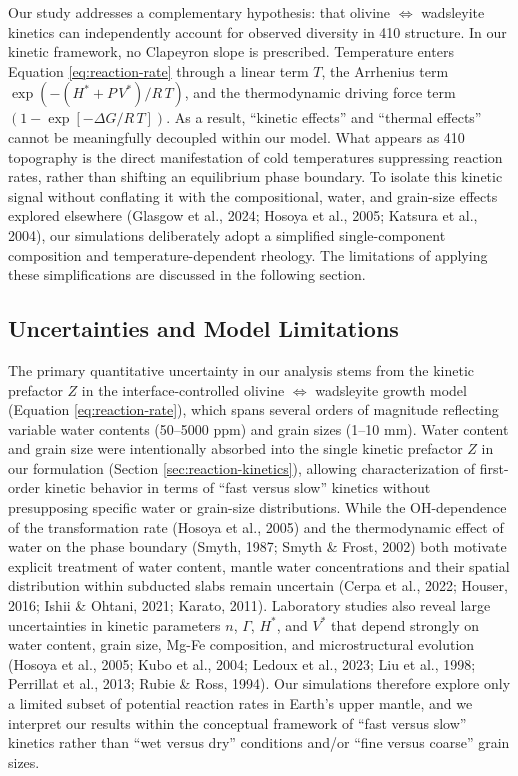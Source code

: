 \documentclass[draft,linenumbers]{agujournal2019}
\begin{document}
Our study addresses a complementary hypothesis: that olivine
\(\Leftrightarrow\) wadsleyite kinetics can independently account for
observed diversity in 410 structure. In our kinetic framework, no
Clapeyron slope is prescribed. Temperature enters Equation
\ref{eq:reaction-rate} through a linear term \(T\), the Arrhenius term
\(\exp\left(-(H^{\ast} + P\, V^{\ast}) / R\, T\right)\), and the
thermodynamic driving force term
\(\left(1 - \exp\left[- \Delta G / R\, T \right]\right)\). As a result,
``kinetic effects'' and ``thermal effects'' cannot be meaningfully
decoupled within our model. What appears as 410 topography is the direct
manifestation of cold temperatures suppressing reaction rates, rather
than shifting an equilibrium phase boundary. To isolate this kinetic
signal without conflating it with the compositional, water, and
grain-size effects explored elsewhere (Glasgow et al., 2024; Hosoya et
al., 2005; {Katsura et al.}, 2004), our simulations deliberately adopt a
simplified single-component composition and temperature-dependent
rheology. The limitations of applying these simplifications are
discussed in the following section.

\subsection{Uncertainties and Model
Limitations}\label{sec:uncertainties-and-model-limitations}

The primary quantitative uncertainty in our analysis stems from the
kinetic prefactor \(Z\) in the interface-controlled olivine
\(\Leftrightarrow\) wadsleyite growth model (Equation
\ref{eq:reaction-rate}), which spans several orders of magnitude
reflecting variable water contents (50--5000 ppm) and grain sizes (1--10
mm). Water content and grain size were intentionally absorbed into the
single kinetic prefactor \(Z\) in our formulation (Section
\ref{sec:reaction-kinetics}), allowing characterization of first-order
kinetic behavior in terms of ``fast versus slow'' kinetics without
presupposing specific water or grain-size distributions. While the
OH-dependence of the transformation rate (Hosoya et al., 2005) and the
thermodynamic effect of water on the phase boundary (Smyth, 1987; Smyth
\& Frost, 2002) both motivate explicit treatment of water content,
mantle water concentrations and their spatial distribution within
subducted slabs remain uncertain (Cerpa et al., 2022; Houser, 2016;
Ishii \& Ohtani, 2021; Karato, 2011). Laboratory studies also reveal
large uncertainties in kinetic parameters \(n\), \(\Gamma\),
\(H^{\ast}\), and \(V^{\ast}\) that depend strongly on water content,
grain size, Mg-Fe composition, and microstructural evolution (Hosoya et
al., 2005; Kubo et al., 2004; {Ledoux et al.}, 2023; Liu et al., 1998;
Perrillat et al., 2013; Rubie \& Ross, 1994). Our simulations therefore
explore only a limited subset of potential reaction rates in Earth's
upper mantle, and we interpret our results within the conceptual
framework of ``fast versus slow'' kinetics rather than ``wet versus
dry'' conditions and/or ``fine versus coarse'' grain sizes.
\end{document}
